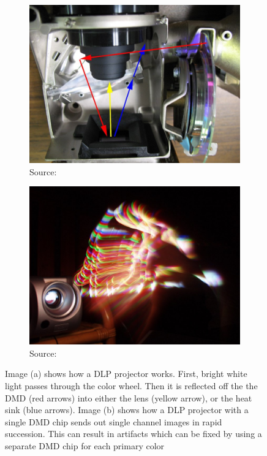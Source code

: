 \begin{figure}[ht]
    \centering
    \begin{subfigure}[b]{0.49\textwidth}
        \centering
        \includegraphics[width=\textwidth]{images/02-projector_dlp.jpg}
        \caption{Source: \citet{ImageProjectorDLP}}
    \end{subfigure}
    \hfill
    \begin{subfigure}[b]{0.49\textwidth}
        \centering
        \includegraphics[width=\textwidth]{images/02-projector_rainbow.JPG}
        \caption{Source: \citet{ImageProjectorDLPRainbow}}
    \end{subfigure}
    \caption{Image (a) shows how a DLP projector works. First, bright white light passes through the color wheel. Then it is reflected off the the DMD (red arrows) into either the lens (yellow arrow), or the heat sink (blue arrows). Image (b) shows how a DLP projector with a single DMD chip sends out single channel images in rapid succession. This can result in artifacts which can be fixed by using a separate DMD chip for each primary color}
    \label{fig:background_projector_dlp}
\end{figure}

